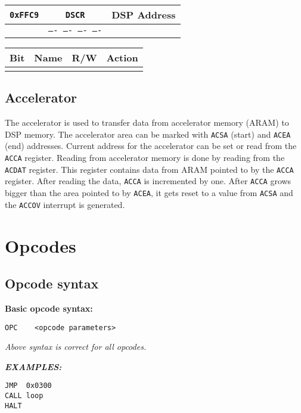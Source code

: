 \documentclass[oneside,english,a4paper,10pt,oneside,openany,final]{memoir}
\newcommand{\Address}[1]{\texttt{#1}}
\newcommand{\Exception}[1]{\texttt{#1}}
\newcommand{\Register}[1]{\texttt{#1}}
\newcommand{\RegisterBitOverview}[4]{
  \begin{table}[H]
  \centering
  \begin{tabular}{|lcl|}
  \hline
  \Address{#1} & \Register{#2} & \multicolumn{1}{r|}{#3} \\ \hline
               & \texttt{#4}   &                         \\ \hline
  \end{tabular}
  \end{table}
}
\newenvironment{RegisterBitDescriptions}
{
  \begin{table}[H]
  \centering
  \begin{tabular}{|l|l|l|p{10cm}|}
  \hline
  \textbf{Bit} & \textbf{Name} & \textbf{R/W} & \textbf{Action} \\ \hline
}
{
  \end{tabular}
  \end{table}
}
\begin{document}
\RegisterBitOverview{0xFFC9}{DSCR}{DSP Address}{---- ---- ---- ----}

\begin{RegisterBitDescriptions}
\RegisterBitDescription{15--0}{d}{W}{}
\end{RegisterBitDescriptions}

\pagebreak{}

\section{Accelerator}

The accelerator is used to transfer data from accelerator memory (ARAM) to DSP memory. The accelerator area can be marked with \Register{ACSA} (start) and \Register{ACEA} (end) addresses.
Current address for the accelerator can be set or read from the \Register{ACCA} register. Reading from accelerator memory is done by reading from the \Register{ACDAT} register.
This register contains data from ARAM pointed to by the \Register{ACCA} register.
After reading the data, \Register{ACCA} is incremented by one.
After \Register{ACCA} grows bigger than the area pointed to by \Register{ACEA}, it gets reset to a value from \Register{ACSA} and the \Exception{ACCOV} interrupt is generated.

\pagebreak{}

\chapter{Opcodes}

\section{Opcode syntax}

\vspace{3mm}
\textbf{Basic opcode syntax:}

\begin{lstlisting}[basicstyle=\ttfamily]
OPC    <opcode parameters>
\end{lstlisting}

\textit{Above syntax is correct for all opcodes.}
\vspace{5mm}

\textbf{\textit{EXAMPLES:}}
\begin{lstlisting}[basicstyle=\ttfamily]
JMP  0x0300
CALL loop
HALT
\end{lstlisting}

\vspace{5mm}
\end{document}
